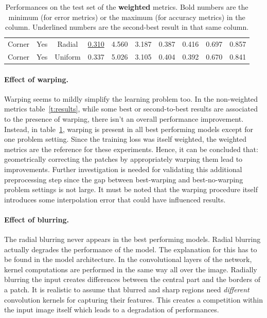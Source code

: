 \begin{table}
{\begin{tabular}{c|c|c|c|c|c|c|c|c|c}
        Corner & Yes & Radial  &  \underline{0.310} &            4.560  &            3.187  &            0.387  &            0.416  &            0.697  &            0.857  \\
        Corner & Yes & Uniform &             0.337  &            5.026  &            3.105  &            0.404  &            0.392  &            0.670  &            0.841  \\
    \end{tabular}}
    \caption{
        Performances on the test set of the \textbf{weighted} metrics.
        Bold numbers are the minimum (for error metrics) or the maximum (for accuracy metrics) in the column.
        Underlined numbers are the second-best result in that same column.
        \label{t:weighted_results}
    }
\end{table}

\paragraph{Effect of warping.}
Warping seems to mildly simplify the learning problem too.
In the non-weighted metrics table~\ref{t:results}, while some best or second-to-best results are associated to the presence of warping, there isn't an overall performance improvement.
Instead, in table~\ref{t:weighted_results}, warping is present in all best performing models except for one problem setting.
Since the training loss was itself weighted, the weighted metrics are the reference for these experiments.
Hence, it can be concluded that: geometrically correcting the patches by appropriately warping them lead to improvements.
Further investigation is needed for validating this additional preprocessing step since the gap between best-warping and best-no-warping problem settings is not large.
It must be noted that the warping procedure itself introduces some interpolation error that could have influenced results.

\paragraph{Effect of blurring.}
The radial blurring never appears in the best performing models.
Radial blurring actually degrades the performance of the model.
The explanation for this has to be found in the model architecture.
In the convolutional layers of the network, kernel computations are performed in the same way all over the image.
Radially blurring the input creates differences between the central part and the borders of a patch.
It is realistic to assume that blurred and sharp regions need \textit{different} convolution kernels for capturing their features.
This creates a competition within the input image itself which leads to a degradation of performances.

